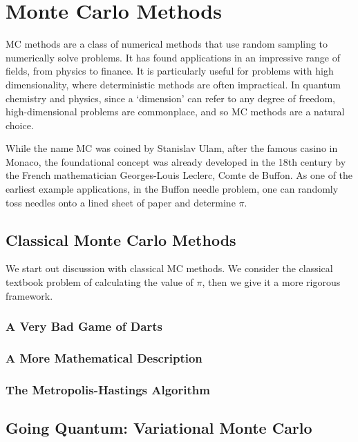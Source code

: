 \chapter{Monte Carlo Methods}
\label{chap:qmc}

\gls{MC} methods are a class of numerical methods that use random sampling to numerically solve problems. It has found applications in an impressive range of fields, from physics to finance. It is particularly useful for problems with high dimensionality, where deterministic methods are often impractical. In quantum chemistry and physics, since a `dimension' can refer to any degree of freedom, high-dimensional problems are commonplace, and so \gls{MC} methods are a natural choice.

While the name \gls{MC} was coined by Stanislav Ulam, after the famous casino in Monaco, the foundational concept was already developed in the 18th century by the French mathematician Georges-Louis Leclerc, Comte de Buffon. As one of the earliest example applications, in the Buffon needle problem, one can randomly toss needles onto a lined sheet of paper and determine $\pi$.

\section{Classical Monte Carlo Methods}

We start out discussion with classical \gls{MC} methods. We consider the classical textbook problem of calculating the value of $\pi$, then we give it a more rigorous framework.

\subsection{A Very Bad Game of Darts}

\subsection{A More Mathematical Description}

\subsection{The Metropolis-Hastings Algorithm}

\section{Going Quantum: Variational Monte Carlo}

